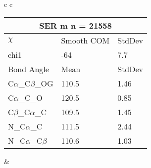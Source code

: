 \begin{longtable}{ c c }
\begin{tabular}{ l l l }
  \toprule
  \multicolumn{3}{c}{SER \textbf{m} n = 21558} \\ \toprule
  $\chi$       & Smooth COM & StdDev \\ \midrule
  chi1 & -64 & 7.7 \\ \midrule
  Bond Angle   & Mean     & StdDev \\ \midrule
  C$\alpha$\_C$\beta$\_OG & 110.5 & 1.46\\
  C$\alpha$\_C\_O & 120.5 & 0.85\\
  C$\beta$\_C$\alpha$\_C & 109.5 & 1.45\\
  N\_C$\alpha$\_C & 111.5 & 2.44\\
  N\_C$\alpha$\_C$\beta$ & 110.6 & 1.03\\
  \bottomrule
  \end{tabular}
  &
  \\
  
\end{longtable}

\newpage

